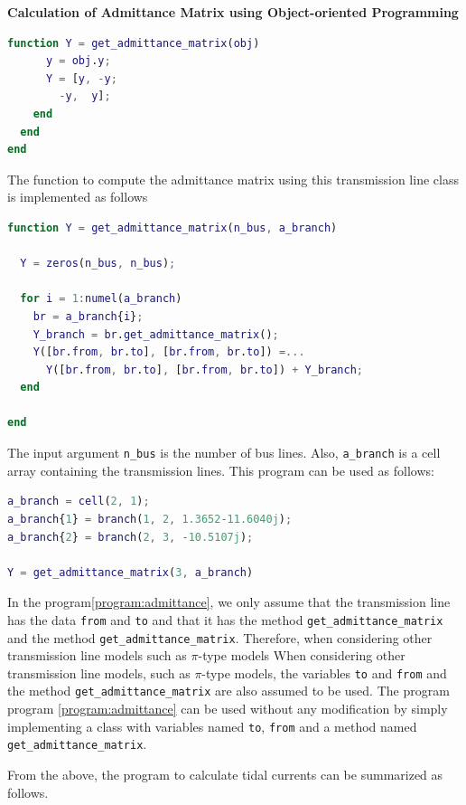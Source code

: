 \documentclass[graybox, envcountchap]{svmult}
\begin{document}
\begin{example}{\textbf{Calculation of Admittance Matrix using Object-oriented Programming}}
\begin{lstlisting}[language=Matlab, caption=branch.m, label={program:branch}]
    function Y = get_admittance_matrix(obj)
      y = obj.y;
      Y = [y, -y;
        -y,  y];
    end
  end
end
\end{lstlisting}

The function to compute the admittance matrix using this transmission line class
is implemented as follows

\begin{lstlisting}[language=Matlab, caption=get\_admittance\_matrix.m, label={program:admittance}]
function Y = get_admittance_matrix(n_bus, a_branch)

  Y = zeros(n_bus, n_bus);

  for i = 1:numel(a_branch)
    br = a_branch{i};
    Y_branch = br.get_admittance_matrix();
    Y([br.from, br.to], [br.from, br.to]) =...
      Y([br.from, br.to], [br.from, br.to]) + Y_branch;
  end

end
\end{lstlisting}

The input argument \verb|n_bus| is the number of bus lines. Also,
\verb|a_branch| is a cell array containing the transmission lines. This program
can be used as follows:

\begin{lstlisting}[language=Matlab, caption=main\_admittance\_matrix.m, label={program:main_admittance}]
a_branch = cell(2, 1);
a_branch{1} = branch(1, 2, 1.3652-11.6040j);
a_branch{2} = branch(2, 3, -10.5107j);

Y = get_admittance_matrix(3, a_branch)
\end{lstlisting}

In the program\nobreak\ref{program:admittance}, we only assume that the
transmission line has the data \verb|from| and \verb|to| and that it has the
method \verb|get_admittance_matrix| and the method \verb|get_admittance_matrix|.
Therefore, when considering other transmission line models such as $\pi$-type
models When considering other transmission line models, such as $\pi$-type
models, the variables \verb|to| and \verb|from| and the method
\verb|get_admittance_matrix| are also assumed to be used. The program program
\nobreak\ref{program:admittance} can be used without any modification by simply
implementing a class with variables named \verb|to|, \verb|from| and a method
named \verb|get_admittance_matrix|.
\end{example}

From the above, the program to calculate tidal currents can be summarized as follows.
\end{document}
